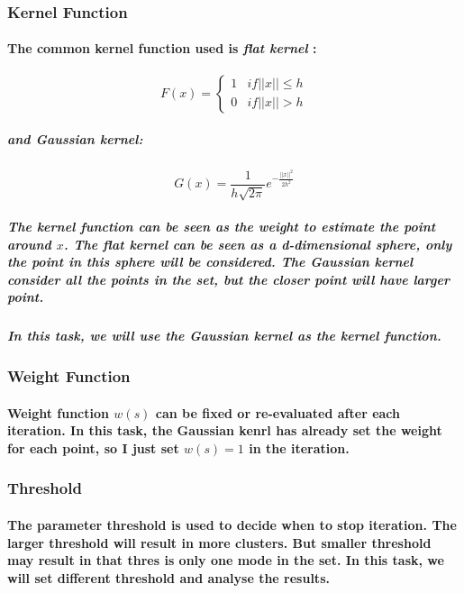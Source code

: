 \documentclass{article}
\begin{document}
\subsubsection{Kernel Function}
\paragraph{
    The common kernel function used is \textit{flat kernel} :
}

\begin{equation}
    F(x) =
    \begin{cases}
        1 &if ||x|| \le h\\
        0 &if ||x|| > h
        \end{cases}
\end{equation}
\subparagraph{and \textit{Gaussian kernel}:}

\begin{equation}
    G(x) = \frac{1}{h\sqrt{2\pi}} e^{-\frac{||x||^2}{2h^2}}
\end{equation}

\subparagraph{
    The kernel function can be seen as the weight to estimate the point around $x$.
    The \textit{flat kernel} can be seen as a d-dimensional sphere, only the point in this sphere will be considered.
    The \textit{Gaussian kernel} consider all the points in the set, but the closer point will have larger point.
}
\subparagraph{
    In this task, we will use the \textit{Gaussian kernel} as the kernel function.
}

\subsubsection{Weight Function}
\paragraph{
    Weight function $w(s)$ can be fixed or re-evaluated after each iteration. In this task, the Gaussian kenrl has already
    set the weight for each point, so I just set $w(s) = 1$ in the iteration.
}

\subsubsection{Threshold}
\paragraph{
    The parameter threshold is used to decide when to stop iteration. The larger threshold will result in more clusters. But smaller threshold may result in
    that thres is only one mode in the set. In this task, we will set different threshold and analyse the results.
}
\end{document}
